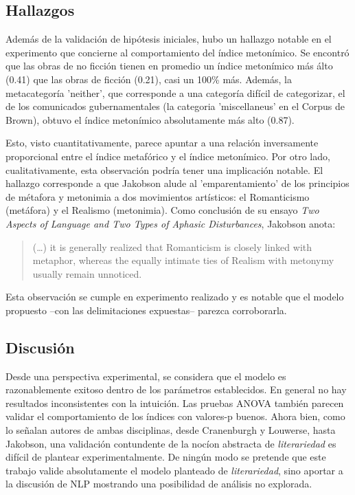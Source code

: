 \documentclass[12pt,letterpaper,twoside]{article}
\begin{document}
\subsection{Hallazgos}
\label{sec:orgdc2d9d6}

Además de la validación de hipótesis iniciales, hubo un hallazgo
notable en el experimento que concierne al comportamiento del
índice metonímico. Se encontró que las obras de no ficción tienen
en promedio un índice metonímico más álto (0.41) que las obras de
ficción (0.21), casi un 100\% más. Además, la metacategoría
'neither', que corresponde a una categoría difícil de categorizar,
el de los comunicados gubernamentales (la categoria 'miscellaneus'
en el Corpus de Brown), obtuvo el índice metonímico absolutamente
más alto (0.87).

Esto, visto cuantitativamente, parece apuntar a una relación
inversamente proporcional entre el índice metafórico y el índice
metonímico. Por otro lado, cualitativamente, esta observación
podría tener una implicación notable.  El hallazgo corresponde a
que Jakobson alude al 'emparentamiento' de los principios de
métafora y metonimia a dos movimientos artísticos: el Romanticismo
(metáfora) y el Realismo (metonimia). Como conclusión de su ensayo
\emph{Two Aspects of Language and Two Types of Aphasic Disturbances},
Jakobson anota:

\begin{quote}
(\ldots{})  it is generally realized that Romanticism is closely linked
with metaphor, whereas the equally intimate ties of Realism with
metonymy usually remain unnoticed. \cite[114]{jakobson1956two}
\end{quote}

Esta observación se cumple en experimento realizado y es notable
que el modelo propuesto --con las delimitaciones expuestas--
parezca corroborarla.


\subsection{Discusión}
\label{sec:orge6a76de}


Desde una perspectiva experimental, se considera que el modelo es
razonablemente exitoso dentro de los parámetros establecidos. En
general no hay resultados inconsistentes con la intuición. Las pruebas
ANOVA también parecen validar el comportamiento de los índices con
valores-p buenos. Ahora bien, como lo señalan autores de ambas
disciplinas, desde Cranenburgh y Louwerse, hasta Jakobson, una
validación contundente de la nocíon abstracta de \emph{literariedad} es
difícil de plantear experimentalmente. De ningún modo se pretende que
este trabajo valide absolutamente el modelo planteado de
\emph{literariedad}, sino aportar a la discusión de NLP mostrando una
posibilidad de análisis no explorada.
\end{document}
